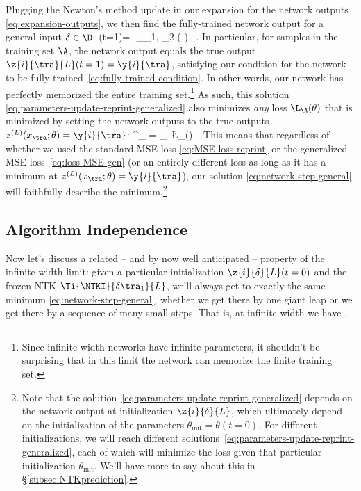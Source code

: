 Plugging the Newton's method update in our expansion for the network outputs \eqref{eq:expansion-outputs}, we then find the fully-trained network output for a general input $\delta\in\D$: 
\be
{}(t=1)=- \sum_{\tra_1, \tra_2 \in\A}   \le(-\ri) \, .\label{eq:network-step-general}
\ee
In particular,
for samples in the training set $\A$, the network output equals the true output $\z{i}{\tra}{L}(t=1)=\y{i}{\tra}$, satisfying our condition for the network to be fully trained~\eqref{eq:fully-trained-condition}.
In other words, our network has perfectly memorized the entire training set.\footnote{Since infinite-width networks have infinite parameters, it shouldn't be surprising that in this limit the network can memorize the finite training set.} 
As such, this solution \eqref{eq:parameters-update-reprint-generalized} also minimizes \emph{any} loss $\L_\A(\theta)$
that is minimized by setting the network outputs to the true outputs $z^{(L)}(x_{\tra};\theta)=\y{i}{\tra}$:
\be\label{eq:loss-minimization-by-Newton}
\theta^\star_{} = \argmin_\theta\, \L_\A(\theta)\, .
\ee
This means that regardless of whether we used the standard MSE loss \eqref{eq:MSE-loss-reprint} or the generalized MSE loss~\eqref{eq:loss-MSE-gen} (or an entirely different loss as long as it has a minimum at $z^{(L)}(x_{\tra};\theta)=\y{i}{\tra}$), our solution \eqref{eq:network-step-general} will faithfully describe the minimum.\footnote{
    Note that the solution~\eqref{eq:parameters-update-reprint-generalized} depends on the network output at initialization $\z{i}{\delta}{L}$, which ultimately depend on the initialization of the parameters $\theta_{\text{init}}=\theta(t=0)$. For different initializations, we will reach different solutions~\eqref{eq:parameters-update-reprint-generalized}, each of which will minimize the loss given that particular initialization $\theta_{\text{init}}$. We'll have more to say about this in \S\ref{subsec:NTKprediction}.
}













    






\subsection{Algorithm Independence}\label{subsec:algorithmic-independence-at-infinity}
Now let's discuss a related -- and by now well anticipated -- property of the infinite-width limit: given a particular initialization $\z{i}{\delta}{L}(t=0)$ and the frozen NTK $\Ti{\NTKI}{\delta \tra_1}{L}$, we'll always get to exactly the same minimum \eqref{eq:network-step-general}, whether we get there by one giant leap or we get there by a sequence of many small steps. That is, at infinite width we have .

